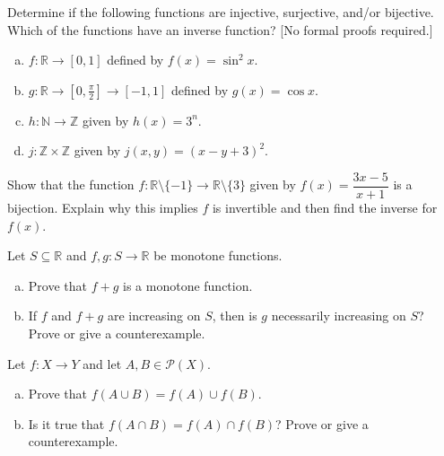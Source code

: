 \documentclass[11pt,letterpaper]{article}
\begin{document}
\homework{}

 Determine if the following functions are injective, surjective, and/or bijective. Which of the functions have an inverse function? [No formal proofs required.]
\begin{enumerate}[(a)]
\item $f: \mathbb{R} \to [0,1]$ defined by $f(x)= \sin^2 x$.
\item $g: \mathbb{R} \to [0, \frac{\pi}{2}] \to [-1, 1]$ defined by $g(x)= \cos x$.
\item $h: \mathbb{N} \to \mathbb{Z}$ given by $h(x)= 3^n$.
\item $j: \mathbb{Z} \times \mathbb{Z}$ given by $j(x,y)= (x - y + 3)^2$.
\end{enumerate}





\newpage





 Show that the function $f: \mathbb{R} \setminus \{ -1 \} \to \mathbb{R} \setminus \{ 3 \}$ given by $f(x)= \dfrac{3x - 5}{x + 1}$ is a bijection. Explain why this implies $f$ is invertible and then find the inverse for $f(x)$. 





\newpage





 Let $S \subseteq \mathbb{R}$ and $f, g: S \to \mathbb{R}$ be monotone functions. 
\begin{enumerate}[(a)]
\item Prove that $f + g$ is a monotone function. 
\item If $f$ and $f + g$ are increasing on $S$, then is $g$ necessarily increasing on $S$? Prove or give a counterexample. 
\end{enumerate}





\newpage





 Let $f: X \to Y$ and let $A, B \in \mathcal{P}(X)$. 
\begin{enumerate}[(a)]
\item Prove that $f(A \cup B)= f(A) \cup f(B)$. 
\item Is it true that $f(A \cap B)= f(A) \cap f(B)$? Prove or give a counterexample. 
\end{enumerate}
\end{document}
